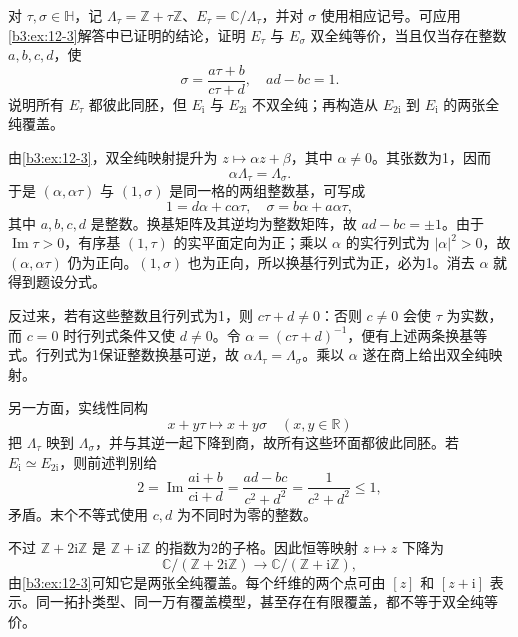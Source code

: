 \begin{exercise}[格基变化与环面的共形结构]\label{b3:ex:12-5}
对 \(\tau,\sigma\in\mathbb H\)，记 \(\Lambda_\tau=\mathbb Z+\tau\mathbb Z\)、\(E_\tau=\mathbb C/\Lambda_\tau\)，并对 \(\sigma\) 使用相应记号。可应用\cref{b3:ex:12-3}解答中已证明的结论，证明 \(E_\tau\) 与 \(E_\sigma\) 双全纯等价，当且仅当存在整数 \(a,b,c,d\)，使
\[
 \sigma=\frac{a\tau+b}{c\tau+d},\quad ad-bc=1.
\]
说明所有 \(E_\tau\) 都彼此同胚，但 \(E_{\mathrm i}\) 与 \(E_{2\mathrm i}\) 不双全纯；再构造从 \(E_{2\mathrm i}\) 到 \(E_{\mathrm i}\) 的两张全纯覆盖。
\end{exercise}
\begin{solution}
由\cref{b3:ex:12-3}，双全纯映射提升为 \(z\mapsto\alpha z+\beta\)，其中 \(\alpha\ne0\)。其张数为1，因而
\[
 \alpha\Lambda_\tau=\Lambda_\sigma.
\]
于是 \((\alpha,\alpha\tau)\) 与 \((1,\sigma)\) 是同一格的两组整数基，可写成
\[
 1=d\alpha+c\alpha\tau,\quad
 \sigma=b\alpha+a\alpha\tau,
\]
其中 \(a,b,c,d\) 是整数。换基矩阵及其逆均为整数矩阵，故 \(ad-bc=\pm1\)。由于 \(\operatorname{Im}\tau>0\)，有序基 \((1,\tau)\) 的实平面定向为正；乘以 \(\alpha\) 的实行列式为 \(|\alpha|^2>0\)，故 \((\alpha,\alpha\tau)\) 仍为正向。\((1,\sigma)\) 也为正向，所以换基行列式为正，必为1。消去 \(\alpha\) 就得到题设分式。

反过来，若有这些整数且行列式为1，则 \(c\tau+d\ne0\)：否则 \(c\ne0\) 会使 \(\tau\) 为实数，而 \(c=0\) 时行列式条件又使 \(d\ne0\)。令 \(\alpha=(c\tau+d)^{-1}\)，便有上述两条换基等式。行列式为1保证整数换基可逆，故 \(\alpha\Lambda_\tau=\Lambda_\sigma\)。乘以 \(\alpha\) 遂在商上给出双全纯映射。

另一方面，实线性同构
\[
 x+y\tau\longmapsto x+y\sigma\quad(x,y\in\mathbb R)
\]
把 \(\Lambda_\tau\) 映到 \(\Lambda_\sigma\)，并与其逆一起下降到商，故所有这些环面都彼此同胚。若 \(E_{\mathrm i}\simeq E_{2\mathrm i}\)，则前述判别给
\[
 2=\operatorname{Im}\frac{a\mathrm i+b}{c\mathrm i+d}
   =\frac{ad-bc}{c^2+d^2}
   =\frac1{c^2+d^2}\le1,
\]
矛盾。末个不等式使用 \(c,d\) 为不同时为零的整数。

不过 \(\mathbb Z+2\mathrm i\mathbb Z\) 是 \(\mathbb Z+\mathrm i\mathbb Z\) 的指数为2的子格。因此恒等映射 \(z\mapsto z\) 下降为
\[
 \mathbb C/(\mathbb Z+2\mathrm i\mathbb Z)
 \longrightarrow\mathbb C/(\mathbb Z+\mathrm i\mathbb Z),
\]
由\cref{b3:ex:12-3}可知它是两张全纯覆盖。每个纤维的两个点可由 \([z]\) 和 \([z+\mathrm i]\) 表示。同一拓扑类型、同一万有覆盖模型，甚至存在有限覆盖，都不等于双全纯等价。
\end{solution}

